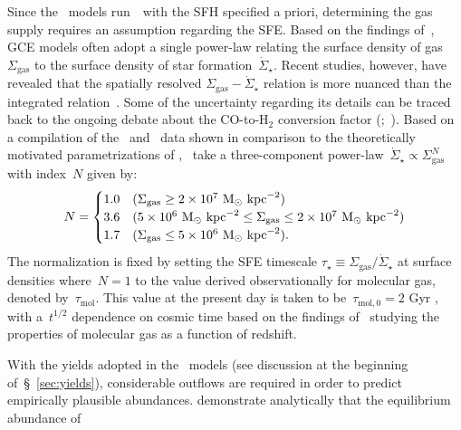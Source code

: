 \documentclass[ms.tex]{subfiles}
\begin{document}
Since the~\citet{Johnson2021} models run~\vice~with the SFH specified a priori,
determining the gas supply requires an assumption regarding the SFE.
Based on the findings of~\citet{Kennicutt1998}, GCE models often adopt a
single power-law relating the surface density of gas~$\Sigma_\text{gas}$ to
the surface density of star formation~$\dot{\Sigma}_\star$.
Recent studies, however, have revealed that the spatially resolved
$\Sigma_\text{gas} - \dot{\Sigma}_\star$ relation is more nuanced than the
integrated relation~\citep{delosReyes2019, Ellison2021, Kennicutt2021}.
Some of the uncertainty regarding its details can be traced back to the
ongoing debate about the CO-to-H$_2$ conversion factor
(\citealp{Kennicutt2012};~\citealp*{Liu2015}).
Based on a compilation of the~\citet{Bigiel2010} and~\citet{Leroy2013} data
shown in comparison to the theoretically motivated parametrizations of
\citet[][see their fig. 2]{Krumholz2018},~\citet{Johnson2021} take a
three-component power-law~$\dot{\Sigma}_\star \propto \Sigma_\text{gas}^N$ with
index~$N$ given by:
\begin{equation}
N =
\begin{cases}
1.0 & (\Sigma_\text{gas} \geq 2\times10^7~\text{M}_\odot~\text{kpc}^{-2}) \\
3.6 & (5\times10^6~\text{M}_\odot~\text{kpc}^{-2} \leq \Sigma_\text{gas} \leq
2\times10^7~\text{M}_\odot~\text{kpc}^{-2}) \\
1.7 & (\Sigma_\text{gas} \leq 5\times10^6~\text{M}_\odot~\text{kpc}^{-2}).
\end{cases}
\label{eq:sflaw_indeces}
\end{equation}
The normalization is fixed by setting the SFE timescale
$\tau_\star \equiv \Sigma_\text{gas} / \dot{\Sigma}_\star$ at surface densities
where~$N = 1$ to the value derived observationally for molecular gas, denoted
by~$\tau_\text{mol}$.
This value at the present day is taken to be~$\tau_{\text{mol},0} = 2$ Gyr
\citep{Leroy2008, Leroy2013}, with a~$t^{1/2}$ dependence on cosmic time based
on the findings of~\citet{Tacconi2018} studying the properties of molecular gas
as a function of redshift.
\par
With the yields adopted in the~\citet{Johnson2021} models (see discussion at
the beginning of~\S~\ref{sec:yields}), considerable outflows are required in
order to predict empirically plausible abundances.
\citet{Weinberg2017} demonstrate analytically that the equilibrium abundance of
\end{document}
